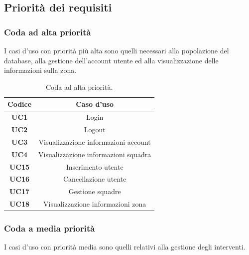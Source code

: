 \subsection{Priorità dei requisiti}
\subsubsection{Coda ad alta priorità}
I casi d'uso con priorità più alta sono quelli necessari alla popolazione del database, alla gestione dell'account utente ed alla visualizzazione delle informazioni sulla zona.

\begin{table}[h!]
	\centering
	\begin{tabular}{|c|c|}
		\hline
		\textbf{Codice} & \textbf{Caso d'uso} \\ \hline
		\textbf{UC1} & Login \\ \hline
		\textbf{UC2} & Logout \\ \hline
		\textbf{UC3} & Visualizzazione informazioni account \\ \hline
		\textbf{UC4} & Visualizzazione informazioni squadra \\ \hline
		\textbf{UC15} & Inserimento utente \\ \hline
		\textbf{UC16} & Cancellazione utente\\ \hline
		\textbf{UC17} & Gestione squadre \\ \hline
		\textbf{UC18} & Visualizzazione informazioni zona \\ \hline
		
	\end{tabular}
	\caption{\label{tab:codaHighPriority}Coda ad alta priorità.}
\end{table}

\subsubsection{Coda a media priorità}
I casi d'uso con priorità media sono quelli relativi alla gestione degli interventi.

